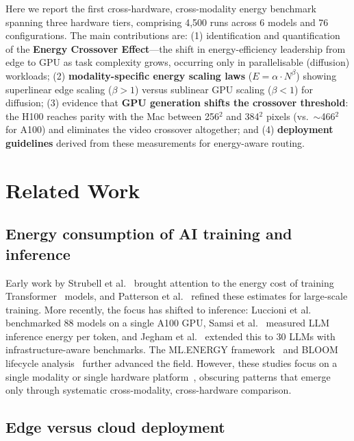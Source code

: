 \documentclass[preprint,12pt]{elsarticle}
\begin{document}
Here we report the first cross-hardware, cross-modality energy benchmark spanning three hardware tiers, comprising 4,500 runs across 6 models and 76 configurations. The main contributions are: (1) identification and quantification of the \textbf{Energy Crossover Effect}---the shift in energy-efficiency leadership from edge to GPU as task complexity grows, occurring only in parallelisable (diffusion) workloads; (2) \textbf{modality-specific energy scaling laws} ($E = \alpha \cdot N^\beta$) showing superlinear edge scaling ($\beta > 1$) versus sublinear GPU scaling ($\beta < 1$) for diffusion; (3) evidence that \textbf{GPU generation shifts the crossover threshold}: the H100 reaches parity with the Mac between 256$^2$ and 384$^2$ pixels (vs.\ $\sim$466$^2$ for A100) and eliminates the video crossover altogether; and (4) \textbf{deployment guidelines} derived from these measurements for energy-aware routing.

\section{Related Work}
\label{sec:related}

\subsection{Energy consumption of AI training and inference}

Early work by Strubell et al.~\cite{strubell2019energy} brought attention to the energy cost of training Transformer~\cite{vaswani2017attention} models, and Patterson et al.~\cite{patterson2021carbon} refined these estimates for large-scale training. More recently, the focus has shifted to inference: Luccioni et al.~\cite{luccioni2024power} benchmarked 88 models on a single A100 GPU, Samsi et al.~\cite{samsi2023words} measured LLM inference energy per token, and Jegham et al.~\cite{jegham2025hungry} extended this to 30 LLMs with infrastructure-aware benchmarks. The ML.ENERGY framework~\cite{you2023zeus} and BLOOM lifecycle analysis~\cite{luccioni2023bloom} further advanced the field. However, these studies focus on a single modality or single hardware platform~\cite{dodge2022measuring}, obscuring patterns that emerge only through systematic cross-modality, cross-hardware comparison.

\subsection{Edge versus cloud deployment}
\end{document}

